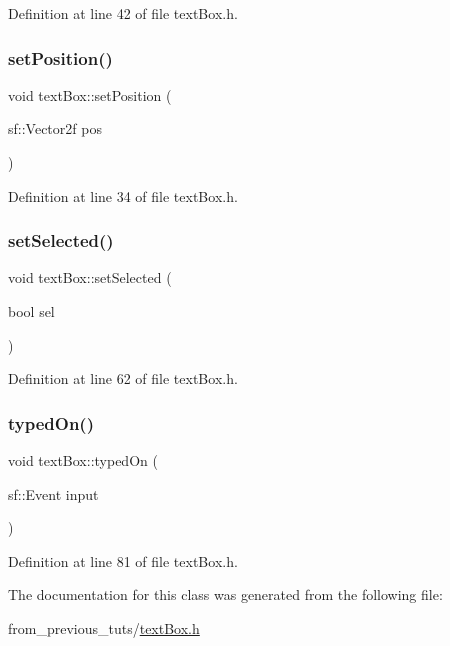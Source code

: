 Definition at line 42 of file text\+Box.\+h.

\mbox{\label{classtext_box_ae2103e20eb1adeb3bb5a29cc50b511b9}} 
\subsubsection{\texorpdfstring{set\+Position()}{setPosition()}}
{\footnotesize\ttfamily void text\+Box\+::set\+Position (\begin{DoxyParamCaption}\item[{sf\+::\+Vector2f}]{pos }\end{DoxyParamCaption})\hspace{0.3cm}{\ttfamily [inline]}}



Definition at line 34 of file text\+Box.\+h.

\mbox{\label{classtext_box_ad119049c6dae381322ba4ff22d9eda42}} 
\subsubsection{\texorpdfstring{set\+Selected()}{setSelected()}}
{\footnotesize\ttfamily void text\+Box\+::set\+Selected (\begin{DoxyParamCaption}\item[{bool}]{sel }\end{DoxyParamCaption})\hspace{0.3cm}{\ttfamily [inline]}}



Definition at line 62 of file text\+Box.\+h.

\mbox{\label{classtext_box_a6ffbf16c973f4a49fed5661813ae9cce}} 
\subsubsection{\texorpdfstring{typed\+On()}{typedOn()}}
{\footnotesize\ttfamily void text\+Box\+::typed\+On (\begin{DoxyParamCaption}\item[{sf\+::\+Event}]{input }\end{DoxyParamCaption})\hspace{0.3cm}{\ttfamily [inline]}}



Definition at line 81 of file text\+Box.\+h.



The documentation for this class was generated from the following file\+:\begin{DoxyCompactItemize}
\item 
from\+\_\+previous\+\_\+tuts/\mbox{\hyperlink{text_box_8h}{text\+Box.\+h}}\end{DoxyCompactItemize}
